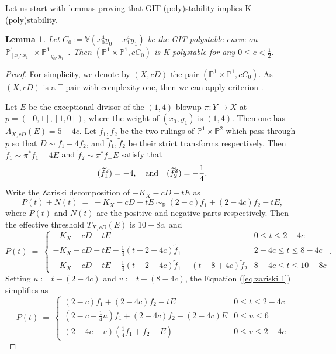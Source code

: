 \documentclass[a4paper,12pt]{amsart}
\newcommand{\wt}[1]{\widetilde{#1}}
\newcommand{\bV}{{\mathbb V}}
\newcommand{\bT}{{\mathbb T}}
\newcommand{\bP}{{\mathbb P}}
\newcommand{\bR}{{\mathbb R}}
\newtheorem{lemma}[theorem]{Lemma}
\theoremstyle{definition}
\theoremstyle{remark}
\begin{document}
Let us start with lemmas proving that GIT (poly)stability implies K-(poly)stability.

\begin{lemma}\label{lem:polystable 1}
    Let $C_0:=\bV(x_0^4y_0-x_1^4y_1)$ be the GIT-polystable curve on $\bP^1_{[x_0:x_1]}\times\bP^1_{[y_0,y_1]}$. Then $(\bP^1\times\bP^1,cC_0)$ is K-polystable for any $0\leq c<\frac{1}{2}$.
\end{lemma}

\begin{proof}
    For simplicity, we denote by $(X,cD)$ the pair $(\bP^1\times\bP^1,cC_0)$. As $(X,cD)$ is a $\bT$-pair with complexity one, then we can apply criterion \cite[Theorem 1.31]{ACC23}. 

    Let $E$ be the exceptional divisor of the $(1,4)$-blowup $\pi:Y\rightarrow X$ at $p=([0,1],[1,0])$, where the weight of $(x_0,y_1)$ is $(1,4)$. Then one has $A_{X,cD}(E)=5-4c$. Let $f_1,f_2$ be the two rulings of $\bP^1\times\bP^2$ which pass through $p$ so that $D\sim f_1+4f_2$, and $\wt{f}_1,\wt{f}_2$ be their strict transforms respectively. Then $\wt{f}_1\sim \pi^*f_1-4E$ and $\wt{f}_2\sim \pi^*f_-E$ satisfy that $$(\wt{f}_1^2)=-4, \ \ \ \textup{and} \ \ \ (\wt{f}_2^2)=-\frac{1}{4}.$$ Write the Zariski decomposition of $-K_X-cD-tE$ as $$P(t)+N(t) \ = \  -K_X-cD-tE \ \sim_{\bR} \ (2-c)f_1+(2-4c)f_2-tE ,$$ where $P(t)$ and $N(t)$ are the positive and negative parts respectively. Then the effective threshold $T_{X,cD}(E)$ is $10-8c$, and  \begin{equation}\label{eq:zariski 1}
        P(t) \ = \ \begin{cases}
            -K_X-cD-tE & 0\leq t\leq 2-4c \\
            -K_X-cD-tE-\frac{1}{4}(t-2+4c)\wt{f}_1 & 2-4c\leq t\leq 8-4c \\
            -K_X-cD-tE-\frac{1}{4}(t-2+4c)\wt{f}_1-(t-8+4c)\wt{f}_2 & 8-4c\leq t\leq 10-8c           
        \end{cases}.
    \end{equation}
Setting $u:=t-(2-4c)$ and $v:=t-(8-4c)$, the Equation (\ref{eq:zariski 1}) simplifies as \begin{equation}\nonumber
        P(t) \ = \ \begin{cases}
            (2-c)f_1+(2-4c)f_2-tE & 0\leq t\leq 2-4c \\
            (2-c-\frac{1}{4}u)f_1+(2-4c)f_2-(2-4c)E  & 0\leq u\leq 6 \\
            (2-4c-v)(\frac{1}{4}f_1+f_2-E) & 0\leq v\leq 2-4c          

\end{cases}
\end{equation}
\end{proof}
\end{document}
